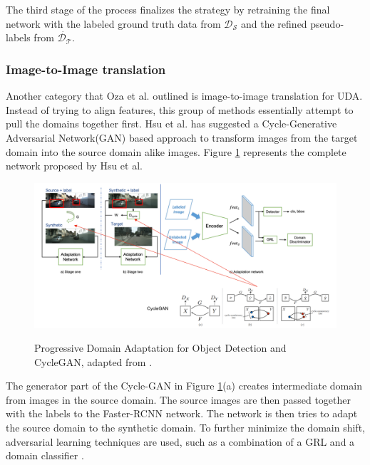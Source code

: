 \documentclass[english, 12pt, a4paper, elec, utf8, a-1b, online]{aaltothesis}
\begin{document}
The third stage of the process finalizes the strategy by retraining the final network with the labeled ground truth data from $\mathcal{D_S}$ and the refined pseudo-labels from $\dot{\mathcal{D_T}}$. 


\subsubsection{Image-to-Image translation}
\label{imagetoimage} 
Another category that Oza et al. \cite{Oza2021} outlined is image-to-image translation for UDA. Instead of trying to align features, this group of methods essentially attempt to pull the domains together first. Hsu et al. \cite{Hsu2019} has suggested a Cycle-Generative Adversarial Network(GAN) \cite{Zhu2017} based approach to transform images from the target domain into the source domain alike images. Figure \ref{gan} represents the complete network proposed by Hsu et al. 

\begin{figure}[htb]
	\begin{center}
		\includegraphics[width=16cm]{./GAN.png}
	\end{center}
	\caption{Progressive Domain Adaptation for Object Detection and CycleGAN, adapted from \cite{Hsu2019}.}
	\begin{center}
		\label{gan}
	\end{center}
\end{figure}
\FloatBarrier

The generator part of the Cycle-GAN in Figure \ref{gan}(a) creates intermediate domain from images in the source domain. The source images are then passed together with the labels to the Faster-RCNN network. The network is then tries to adapt the source domain to the synthetic domain. To further minimize the domain shift, adversarial learning techniques are used, such as a combination of a GRL and a domain classifier \cite{Hsu2019}.
\end{document}
